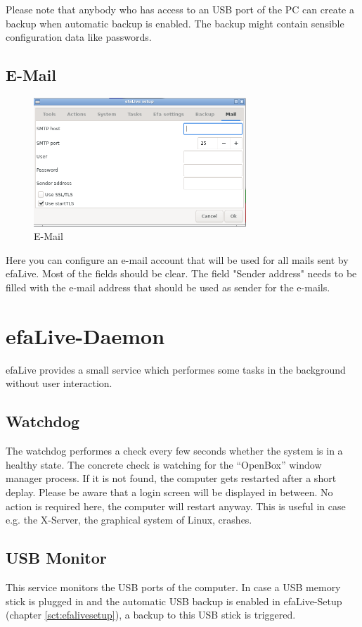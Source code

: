 \documentclass[a4paper,12pt,twoside]{article}
\begin{document}
Please note that anybody who has access to an USB port of the PC can
create a backup when automatic backup is enabled. The backup might
contain sensible configuration data like passwords.


\subsection{E-Mail}
\label{sct:efalivesetup_email}

\begin{figure}
    \centering
    \includegraphics[width=8cm]{screenshots/efalive_setup_email.png}
    \caption{E-Mail}
    \label{fig:efalivesetup_email}
\end{figure}

Here you can configure an e-mail account that will be used for all mails
sent by efaLive. Most of the fields should be clear. The field "Sender address"
needs to be filled with the e-mail address that should be used as sender
for the e-mails.


\section{efaLive-Daemon}
\label{sct:efalivedaemon}
efaLive provides a small service which performes some tasks
in the background without user interaction.


\subsection{Watchdog}
\label{sct:watchdog}
The watchdog performes a check every few seconds whether the system is in
a healthy state. The concrete check is watching for the "`OpenBox"' window
manager process. If it is not found, the computer gets restarted after a 
short deplay. Please be
aware that a login screen will be displayed in between. No action is
required here, the computer will restart anyway.
This is useful in case e.g. the X-Server, the graphical system of Linux,
crashes.


\subsection{USB Monitor}
\label{sct:usb_monitor}
This service monitors the USB ports of the computer. In case a USB memory
stick is plugged in and the automatic USB backup is enabled in efaLive-Setup
(chapter \ref{sct:efalivesetup}), a backup to this USB stick is triggered.
\end{document}
